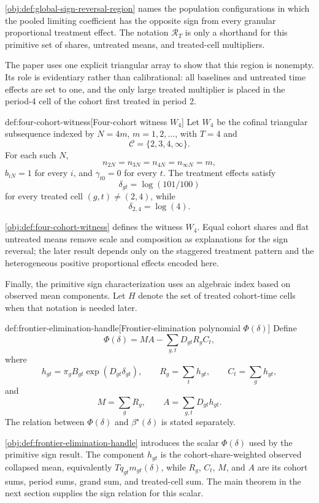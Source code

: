 \cref{obj:def:global-sign-reversal-region} names the population configurations in which the pooled limiting coefficient has the opposite sign from every granular proportional treatment effect. The notation \(\mathcal R_T\) is only a shorthand for this primitive set of shares, untreated means, and treated-cell multipliers.

The paper uses one explicit triangular array to show that this region is nonempty. Its role is evidentiary rather than calibrational: all baselines and untreated time effects are set to one, and the only large treated multiplier is placed in the period-4 cell of the cohort first treated in period 2.

\begin{definitionv}{def:four-cohort-witness}[Four-cohort witness $W_4$]
Let $W_4$ be the cofinal triangular subsequence indexed by $N=4m$, $m=1,2,\ldots$, with $T=4$ and
\[
\mathcal C=\{2,3,4,\infty\}.
\]
For each such $N$,
\[
n_{2N}=n_{3N}=n_{4N}=n_{\infty N}=m,
\]
$b_{iN}=1$ for every $i$, and $\gamma_{t0}=0$ for every $t$. The treatment effects satisfy
\[
\delta_{gt}=\log(101/100)
\]
for every treated cell $(g,t)\ne(2,4)$, while
\[
\delta_{2,4}=\log(4).
\]
\end{definitionv}

\cref{obj:def:four-cohort-witness} defines the witness \(W_4\). Equal cohort shares and flat untreated means remove scale and composition as explanations for the sign reversal; the later result depends only on the staggered treatment pattern and the heterogeneous positive proportional effects encoded here.

Finally, the primitive sign characterization uses an algebraic index based on observed mean components. Let \(H\) denote the set of treated cohort-time cells when that notation is needed later.

\begin{definitionv}{def:frontier-elimination-handle}[Frontier-elimination polynomial $\Phi(\delta)$]
Define
\[
\Phi(\delta)
=
M A
-
\sum_{g,t} D_{gt} R_g C_t,
\]
where
\[
h_{gt}
=
\pi_g B_{gt}\exp(D_{gt}\delta_{gt}),\qquad
R_g=\sum_t h_{gt},\qquad
C_t=\sum_g h_{gt},
\]
and
\[
M=\sum_g R_g,\qquad
A=\sum_{g,t}D_{gt}h_{gt}.
\]
The relation between $\Phi(\delta)$ and $\beta^\star(\delta)$ is stated separately.
\end{definitionv}

\cref{obj:def:frontier-elimination-handle} introduces the scalar \(\Phi(\delta)\) used by the primitive sign result. The component \(h_{gt}\) is the cohort-share-weighted observed collapsed mean, equivalently \(Tq_{gt}m_{gt}(\delta)\), while \(R_g\), \(C_t\), \(M\), and \(A\) are its cohort sums, period sums, grand sum, and treated-cell sum. The main theorem in the next section supplies the sign relation for this scalar.
